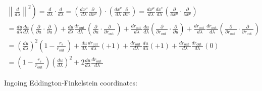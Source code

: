 \begin{equation}
    \begin{array}{l}
        \left.\left\|\frac{d}{d \lambda}\right\|^2\right)=\frac{d}{d \lambda} \cdot \frac{d}{d \lambda}=\left(\frac{d x^\mu}{d \lambda} \frac{\partial}{\partial x^\mu}\right) \cdot\left(\frac{d x^v}{d \lambda} \frac{\partial}{\partial x^v}\right)=\frac{d x^\mu}{d \lambda} \frac{d x^v}{d \lambda}\left(\frac{\partial}{\partial x^\mu} \cdot \frac{\partial}{\partial x^\nu}\right)                                                                                                                                                                                                                               \\
        =\frac{d u}{d \lambda} \frac{d u}{d \lambda}\left(\frac{\partial}{\partial u} \cdot \frac{\partial}{\partial u}\right)+\frac{d u}{d \lambda} \frac{d r_{\text {out }}}{d \lambda}\left(\frac{\partial}{\partial u} \cdot \frac{\partial}{\partial r_{\text {out }}}\right)+\frac{d r_{\text {out }}}{d \lambda} \frac{d u}{d \lambda}\left(\frac{\partial}{\partial r_{\text {out }}} \cdot \frac{\partial}{\partial u}\right)+\frac{d r_{\text {out }}}{d \lambda} \frac{d r_{\text {out }}}{d \lambda}\left(\frac{\partial}{\partial r_{\text {out }}} \cdot \frac{\partial}{\partial r_{\text {out }}}\right) \\
        =\left(\frac{d u}{d \lambda}\right)^2\left(1-\frac{r_s}{r_{\text {out }}}\right)+\frac{d u}{d \lambda} \frac{d r_{\text {out }}}{d \lambda}(+1)+\frac{d r_{\text {out }}}{d \lambda} \frac{d u}{d \lambda}(+1)+\frac{d r_{\text {out }}}{d \lambda} \frac{d r_{\text {out }}}{d \lambda}(0)                                                                                                                                                                                                                                                                                                                      \\
        =\left(1-\frac{r_s}{r_{\text {out }}}\right)\left(\frac{d u}{d \lambda}\right)^2+2 \frac{d u}{d \lambda} \frac{d r_{\text {out }}}{d \lambda}
    \end{array}
\end{equation}


Ingoing Eddington-Finkelstein coordinates:

